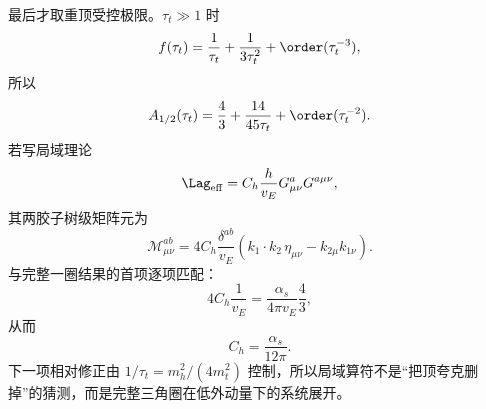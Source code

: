 \begin{derivation}
最后才取重顶受控极限。$\tau_t\gg1$ 时
\begin{equation*}
f(\tau_t)=\frac1{\tau_t}+\frac1{3\tau_t^2}+\order(\tau_t^{-3}),
\end{equation*}
所以
\begin{equation*}
A_{1/2}(\tau_t)=\frac43+\frac{14}{45\tau_t}+\order(\tau_t^{-2}).
\end{equation*}
若写局域理论
\begin{equation*}
\Lag_{\rm eff}=C_h\frac{h}{v_E}G^a_{\mu\nu}G^{a\mu\nu},
\end{equation*}
其两胶子树级矩阵元为
\begin{equation*}
\mathcal M_{\mu\nu}^{ab}
=4C_h\frac{\delta^{ab}}{v_E}
\left(k_1\!\cdot k_2\,\eta_{\mu\nu}-k_{2\mu}k_{1\nu}\right).
\end{equation*}
与完整一圈结果的首项逐项匹配：
\begin{equation*}
4C_h\frac1{v_E}
=\frac{\alpha_s}{4\pi v_E}\frac43,
\end{equation*}
从而
\begin{equation*}
\boxed{C_h=\frac{\alpha_s}{12\pi}.}
\end{equation*}
下一项相对修正由 $1/\tau_t=m_h^2/(4m_t^2)$ 控制，所以局域算符不是“把顶夸克删掉”的猜测，而是完整三角圈在低外动量下的系统展开。
\end{derivation}

